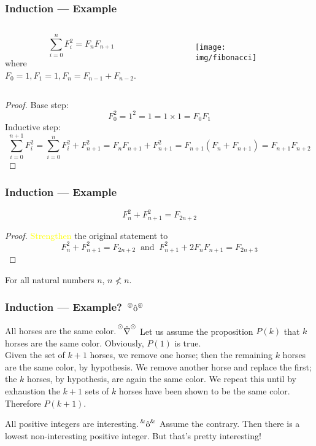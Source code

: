 \documentclass[UTF8,11pt,colorlinks,compress,openany]{beamer}%
\begin{document}
\begin{frame}\frametitle{Induction --- Example}
	\begin{columns}
			\begin{theorem}
				\[\sum\limits_{i=0}^nF_i^2=F_nF_{n+1}\]
				where $F_0=1, F_1=1, F_n=F_{n-1}+F_{n-2}$.
			\end{theorem}
		\begin{figure}
			\texttt{[image: img/fibonacci]}
		\end{figure}
	\end{columns}
	\begin{proof}
		Base step:
		\[F_0^2=1^2=1=1\times 1=F_0F_1\]
		Inductive step:
		\[\sum\limits_{i=0}^{n+1}F_i^2=\sum\limits_{i=0}^n F_i^2+F_{n+1}^2=F_nF_{n+1}+F_{n+1}^2=F_{n+1}(F_n+F_{n+1})=F_{n+1}F_{n+2}\]
	\end{proof}
\end{frame}

\begin{frame}\frametitle{Induction --- Example}
	\begin{theorem}
		\[F_n^2+F_{n+1}^2=F_{2n+2}\]
	\end{theorem}\setlength\belowdisplayskip{0pt}
	\begin{proof}
		\textcolor{yellow}{Strengthen} the original statement to
		\[F_n^2+F_{n+1}^2=F_{2n+2}\;\;\text{and}\;\;F_{n+1}^2+2F_nF_{n+1}=F_{2n+3}\]
	\end{proof}
	\begin{problem}
		For all natural numbers $n$, $n\not< n$.
	\end{problem}
\end{frame}

\begin{frame}\frametitle{Induction --- Example? $\sideset{^\circledcirc}{^\circledcirc}{\operatorname{\hat{o}}}$}
	\begin{block}{All horses are the same color.$\sideset{^{\odot}}{^{\odot}}{\operatorname{\hat{\nabla}}}$}
		Let us assume the proposition $P(k)$ that $k$ horses are the same color. Obviously, $P(1)$ is true.\\
		Given the set of $k+1$ horses, we remove one horse; then the remaining $k$ horses are the same color, by hypothesis. We remove another horse and replace the first; the $k$ horses, by hypothesis, are again the same color. We repeat this until by exhaustion the $k+1$ sets of $k$ horses have been shown to be the same color. Therefore $P(k+1)$.
	\end{block}
	\begin{block}{All positive integers are interesting.$\sideset{^\&}{^\&}{\operatorname{\hat{o}}}$}
		Assume the contrary. Then there is a lowest non-interesting positive integer. But that's pretty interesting!
	\end{block}
\end{frame}
\end{document}
